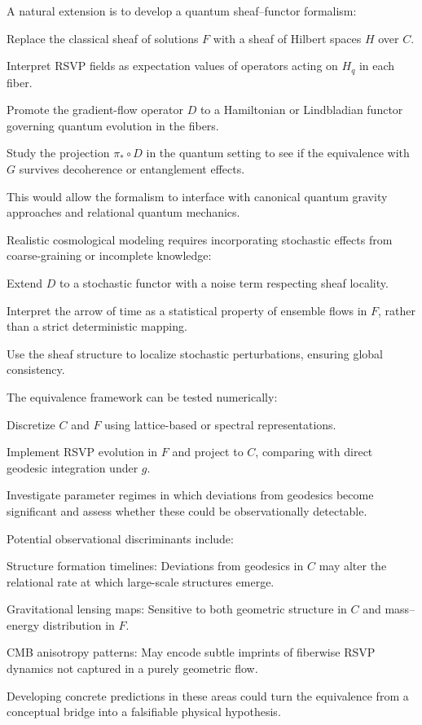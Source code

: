 \documentclass[11pt]{article}
\theoremstyle{plain}
\theoremstyle{definition}
\begin{document}
A natural extension is to develop a quantum sheaf–functor formalism:

Replace the classical sheaf of solutions $F$ with a sheaf of Hilbert spaces $H$ over $C$.

Interpret RSVP fields as expectation values of operators acting on $H_q$ in each fiber.

Promote the gradient-flow operator $D$ to a Hamiltonian or Lindbladian functor governing quantum evolution in the fibers.

Study the projection $\pi_* \circ D$ in the quantum setting to see if the equivalence with $G$ survives decoherence or entanglement effects.

This would allow the formalism to interface with canonical quantum gravity approaches and relational quantum mechanics.

Realistic cosmological modeling requires incorporating stochastic effects from coarse-graining or incomplete knowledge:

Extend $D$ to a stochastic functor with a noise term respecting sheaf locality.

Interpret the arrow of time as a statistical property of ensemble flows in $F$, rather than a strict deterministic mapping.

Use the sheaf structure to localize stochastic perturbations, ensuring global consistency.

The equivalence framework can be tested numerically:

Discretize $C$ and $F$ using lattice-based or spectral representations.

Implement RSVP evolution in $F$ and project to $C$, comparing with direct geodesic integration under $g$.

Investigate parameter regimes in which deviations from geodesics become significant and assess whether these could be observationally detectable.

Potential observational discriminants include:

Structure formation timelines: Deviations from geodesics in $C$ may alter the relational rate at which large-scale structures emerge.

Gravitational lensing maps: Sensitive to both geometric structure in $C$ and mass–energy distribution in $F$.

CMB anisotropy patterns: May encode subtle imprints of fiberwise RSVP dynamics not captured in a purely geometric flow.

Developing concrete predictions in these areas could turn the equivalence from a conceptual bridge into a falsifiable physical hypothesis.
\end{document}

